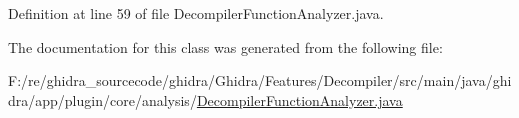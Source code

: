 Definition at line 59 of file Decompiler\+Function\+Analyzer.\+java.



The documentation for this class was generated from the following file\+:\begin{DoxyCompactItemize}
\item 
F\+:/re/ghidra\+\_\+sourcecode/ghidra/\+Ghidra/\+Features/\+Decompiler/src/main/java/ghidra/app/plugin/core/analysis/\mbox{\hyperlink{_decompiler_function_analyzer_8java}{Decompiler\+Function\+Analyzer.\+java}}\end{DoxyCompactItemize}
